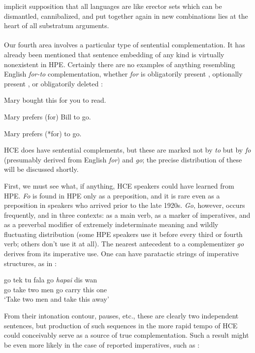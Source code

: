 implicit supposition that all languages are like erector sets which can be dismantled, cannibalized, and put together again in new combinations lies at the heart of all substratum arguments.\\\\

Our fourth area involves a particular type of sentential comple\-mentation. It has already been mentioned that sentence embedding of any kind is virtually nonexistent in HPE. Certainly there are no examples of anything resembling English \textit{for-to} complementation,
whether \textit{for} is obligatorily present , optionally present , or obligatorily deleted :

\ea\label{ex:56}
 Mary bought this for you to read.
\z

\ea\label{ex:57}
 Mary prefers (for) Bill to go.
\z

\ea\label{ex:58}
 Mary prefers (*for) to go.
\z

\noindent HCE does have sentential complements, but these are marked not by \textit{to} but by \textit{fo} (presumably derived from English \textit{for}) and \textit{go}; the precise distribution of these will be discussed shortly.

First, we must see what, if anything, HCE speakers could have learned from HPE. \textit{Fo} is found in HPE only as a preposition, and it is rare even as a preposition in speakers who arrived prior to the late 1920s. \textit{Go}, however, occurs frequently, and in three contexts: as a main verb, as a marker of imperatives, and as a preverbal modifier of extremely indeterminate meaning and wildly fluctuating distribution (some HPE speakers use it before every third or fourth verb; others don't use it at all). The nearest antecedent to a complementizer \textit{go} derives from its imperative use. One can have paratactic strings of imperative structures, as in :

\ea\label{ex:59}
\gll go tek tu fala go \emph{hapai} dis wan\\
go take two men go carry this one \\
\glt `Take two men and take this away'
\z

\noindent From their intonation contour, pauses, etc., these are clearly two independent sentences, but production of such sequences in the more rapid tempo of HCE could conceivably serve as a source of true comple\-mentation. Such a result might be even more likely in the case of reported imperatives, such as :

